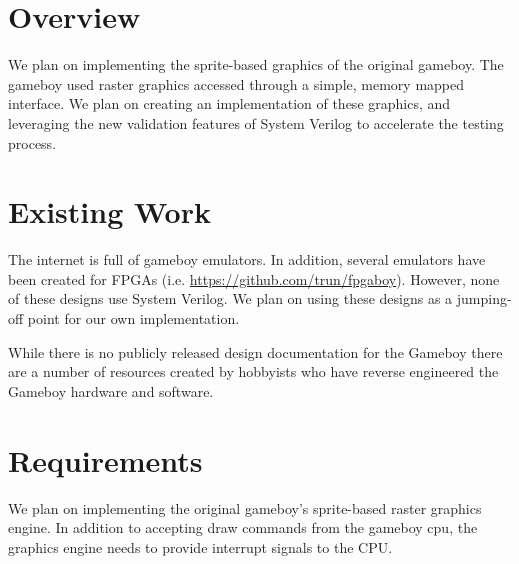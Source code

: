 \documentclass{article}
\begin{document}
\newenvironment{frcseries}{\fontfamily{frc}\selectfont}{}
\newcommand{\textfrc}[1]{{\frcseries#1}}
\newcommand{\mathfrc}[1]{\text{\textfrc{#1}}}




\section{Overview}
We plan on implementing the sprite-based graphics of the original
gameboy. The gameboy used raster graphics accessed through a simple,
memory mapped interface. We plan on creating an implementation of these
graphics, and leveraging the new validation features of System Verilog
to accelerate the testing process. 

\section{Existing Work}
The internet is full of gameboy emulators. In addition, several
emulators have been created for FPGAs (i.e.
\url{https://github.com/trun/fpgaboy}). However, none of these designs
use System Verilog. We plan on using these designs as a jumping-off
point for our own implementation.

While there is no publicly released design documentation for the 
Gameboy there are a number of resources created by hobbyists who 
have reverse engineered the Gameboy hardware and software.

\section{Requirements}

We plan on implementing the original gameboy's sprite-based raster
graphics engine. In addition to accepting draw commands from the
gameboy cpu, the graphics engine needs to provide interrupt signals to
the CPU. 
\end{document}
